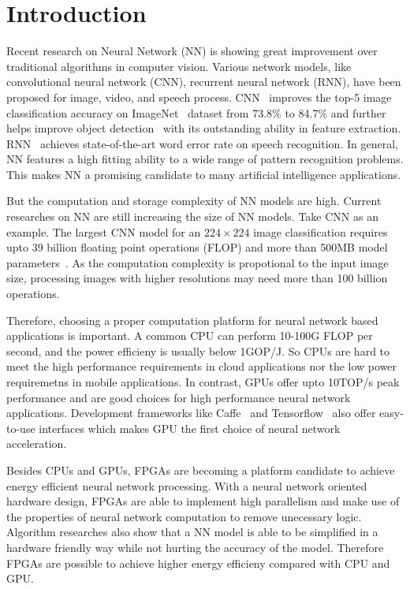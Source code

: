 \section{Introduction}\label{sec:introduction}

Recent research on Neural Network (NN) is showing great improvement over traditional algorithms in computer vision. Various network models, like convolutional neural network (CNN), recurrent neural network (RNN), have been proposed for image, video, and speech process. CNN~\cite{krizhevsky2012imagenet} improves the top-5 image classification accuracy on ImageNet~\cite{ILSVRC15} dataset from 73.8\% to 84.7\% and further helps improve object detection~\cite{girshick2014rich} with its outstanding ability in feature extraction. RNN~\cite{hannun2014deep} achieves state-of-the-art word error rate on speech recognition. In general, NN features a high fitting ability to a wide range of pattern recognition problems. This makes NN a promising candidate to many artificial intelligence applications.

But the computation and storage complexity of NN models are high. Current researches on NN are still increasing the size of NN models. Take CNN as an example. The largest CNN model for an $224\times224$ image classification requires upto 39 billion floating point operations (FLOP) and more than 500MB model parameters~\cite{simonyan2014very}. As the computation complexity is propotional to the input image size, processing images with higher resolutions may need more than 100 billion operations.

Therefore, choosing a proper computation platform for neural network based applications is important. A common CPU can perform 10-100G FLOP per second, and the power efficieny is usually below 1GOP/J. So CPUs are hard to meet the high performance requirements in cloud applications nor the low power requiremetns in mobile applications. In contrast, GPUs offer upto 10TOP/s peak performance and are good choices for high performance neural network applications. Development frameworks like Caffe~\cite{jia2014caffe} and Tensorflow~\cite{abadi2016tensorflow} also offer easy-to-use interfaces which makes GPU the first choice of neural network acceleration. 

Besides CPUs and GPUs, FPGAs are becoming a platform candidate to achieve energy efficient neural network processing. With a neural network oriented hardware design, FPGAs are able to implement high parallelism and make use of the properties of neural network computation to remove unecessary logic. Algorithm researches also show that a NN model is able to be simplified in a hardware friendly way while not hurting the accuracy of the model. Therefore FPGAs are possible to achieve higher energy efficieny compared with CPU and GPU. 

